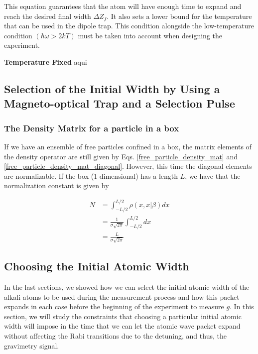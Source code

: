 \documentclass{article}
\begin{document}
This equation guarantees that the atom will have enough time to expand and reach the desired final width $\Delta Z_{f}$. It also sets a lower bound for the temperature that can be used in the dipole trap. This condition alongside the low-temperature condition $(\hbar \omega > 2kT)$ must be taken into account when designing the experiment.

\vspace{5mm}
\textbf{Temperature Fixed}
aqui

\subsection{Selection of the Initial Width by Using a Magneto-optical Trap and a Selection Pulse}

\subsubsection{The Density Matrix for a particle in a box}
If we have an ensemble of free particles confined in a box, the matrix elements of the density operator are still given by Eqs. \ref{free_particle_density_mat} and \ref{free_particle_density_mat_diagonal}. However, this time the diagonal elements are normalizable. If the box (1-dimensional) has a length $L$, we have that the normalization constant is given by

\begin{equation}
   \begin{split}
        N & = \int_{-L/2}^{L/2} \rho(x, x | \beta) dx \\ & = \frac{1}{\sigma \sqrt{2\pi}} \int_{-L/2}^{L/2} dx \\ & = \frac{L}{\sigma \sqrt{2\pi}}
   \end{split}
\end{equation}

\subsection{Choosing the Initial Atomic Width}
In the last sections, we showed how we can select the initial atomic width of the alkali atoms to be used during the measurement process and how this packet expands in each case before the beginning of the experiment to measure $g$. In this section, we will study the constraints that choosing a particular initial atomic width will impose in the time that we can let the atomic wave packet expand without affecting the Rabi transitions due to the detuning, and thus, the gravimetry signal.
\end{document}
